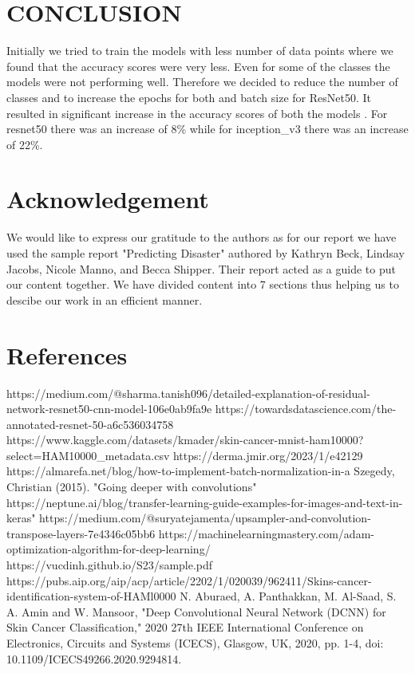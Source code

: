 \documentclass[conference]{IEEEtran}
\begin{document}
\section{CONCLUSION}
Initially we tried to train the models with less number of data points where we found that the accuracy scores were very less. Even for some of the classes the models were not performing well. Therefore we decided to reduce the number of classes and  to increase the epochs for both and batch size for ResNet50. It resulted in significant increase in the accuracy scores of both the models . For resnet50 there was an increase of 8\% while for inception\_v3 there was an increase of 22\%. 

\section{Acknowledgement}
We would like to express our gratitude to the authors as for our report we have used the sample report "Predicting Disaster" authored by Kathryn Beck, Lindsay Jacobs, Nicole Manno, and Becca Shipper. Their report acted as a guide to put our content together.
We have divided content into 7 sections thus helping us to descibe our work in an efficient manner.

\section{References}
\begin{thebibliography}{00}
 https://medium.com/@sharma.tanish096/detailed-explanation-of-residual-network-resnet50-cnn-model-106e0ab9fa9e
 https://towardsdatascience.com/the-annotated-resnet-50-a6c536034758
 https://www.kaggle.com/datasets/kmader/skin-cancer-mnist-ham10000?select=HAM10000\_metadata.csv
 https://derma.jmir.org/2023/1/e42129
 https://almarefa.net/blog/how-to-implement-batch-normalization-in-a
 Szegedy, Christian (2015). "Going deeper with convolutions"
 https://neptune.ai/blog/transfer-learning-guide-examples-for-images-and-text-in-keras"
 https://medium.com/@suryatejamenta/upsampler-and-convolution-transpose-layers-7e4346c05bb6
 https://machinelearningmastery.com/adam-optimization-algorithm-for-deep-learning/
 https://vucdinh.github.io/S23/sample.pdf
 https://pubs.aip.org/aip/acp/article/2202/1/020039/962411/Skins-cancer-identification-system-of-HAMl0000
 N. Aburaed, A. Panthakkan, M. Al-Saad, S. A. Amin and W. Mansoor, "Deep Convolutional Neural Network (DCNN) for Skin Cancer Classification," 2020 27th IEEE International Conference on Electronics, Circuits and Systems (ICECS), Glasgow, UK, 2020, pp. 1-4, doi: 10.1109/ICECS49266.2020.9294814.

\end{thebibliography}
\vspace{12pt}
\end{document}
